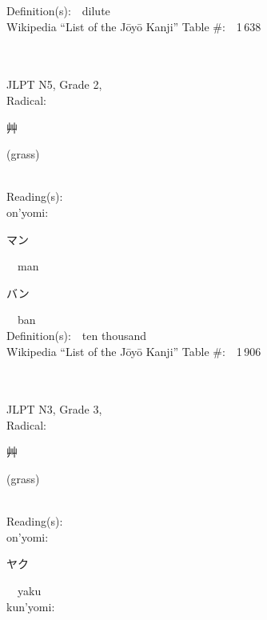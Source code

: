\begin{multicols}{2}
Definition(s):\ \ dilute \\
Wikipedia ``List of the J\=oy\=o Kanji'' Table \#:\ \ 1\,638 \\
\ \ \\
{\fontsize{34pt}{40pt}  }\ \ \\  %
{JLPT N5, Grade 2, \\Radical:\ \ {\begin{CJK}{UTF8}{min} 艸 \end{CJK}} (grass) } \\
Reading(s):\ \ \\
{\hspace*{1em}}on'yomi:\ \ \\
{\hspace*{2em}}{\begin{CJK}{UTF8}{min} マン \end{CJK}}\ \ man\ \ \\
{\hspace*{2em}}{\begin{CJK}{UTF8}{min} バン \end{CJK}}\ \ ban\ \ \\
Definition(s):\ \ ten thousand \\
Wikipedia ``List of the J\=oy\=o Kanji'' Table \#:\ \ 1\,906 \\
\ \ \\
{\fontsize{34pt}{40pt}  }\ \ \\  %
{JLPT N3, Grade 3, \\Radical:\ \ {\begin{CJK}{UTF8}{min} 艸 \end{CJK}} (grass) } \\
Reading(s):\ \ \\
{\hspace*{1em}}on'yomi:\ \ \\
{\hspace*{2em}}{\begin{CJK}{UTF8}{min} ヤク \end{CJK}}\ \ yaku\ \ \\
{\hspace*{1em}}kun'yomi:\ \ \\

\end{multicols}
